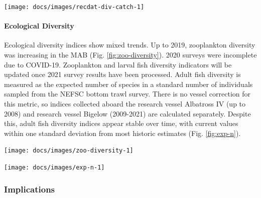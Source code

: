 \documentclass[
  10pt,
]{article}
\let\origfigure\figure
\let\endorigfigure\endfigure
\renewenvironment{figure}[1][2] {
    \expandafter\origfigure\expandafter[H]
} {
    \endorigfigure
}
\begin{document}
\begin{figure}

{\centering \texttt{[image: docs/images/recdat-div-catch-1]} 

}

\caption{Diversity of recreational catch in the Mid-Atlantic.}\label{fig:recdat-div-catch}
\end{figure}

\hypertarget{ecological-diversity}{%
\paragraph{Ecological Diversity}\label{ecological-diversity}}

Ecological diversity indices show mixed trends. Up to 2019, zooplankton
diversity was increasing in the MAB (Fig. \ref{fig:zoo-diversity}). 2020
surveys were incomplete due to COVID-19. Zooplankton and larval fish
diversity indicators will be updated once 2021 survey results have been
processed. Adult fish diversity is measured as the expected number of
species in a standard number of individuals sampled from the NEFSC
bottom trawl survey. There is no vessel correction for this metric, so
indices collected aboard the research vessel Albatross IV (up to 2008)
and research vessel Bigelow (2009-2021) are calculated separately.
Despite this, adult fish diversity indices appear stable over time, with
current values within one standard deviation from most historic
estimates (Fig. \ref{fig:exp-n}).

\begin{figure}

{\centering \texttt{[image: docs/images/zoo-diversity-1]} 

}

\caption{Zooplankton diversity in the Mid-Atlantic Bight up to 2019, based on Shannon diversity index.}\label{fig:zoo-diversity}
\end{figure}

\begin{figure}

{\centering \texttt{[image: docs/images/exp-n-1]} 

}

\caption{Adult fish diversity in the Mid-Atlantic Bight, based on expected number of species. Results from survey vessels Albatross and Bigelow are reported separately due to catchability differences.}\label{fig:exp-n}
\end{figure}

\hypertarget{implications-3}{%
\subsubsection{Implications}\label{implications-3}}
\end{document}
